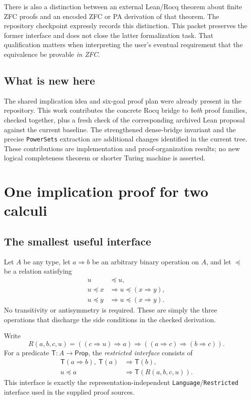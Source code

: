 \documentclass[11pt]{article}
\newcommand{\Imp}{\mathbin{\Rightarrow}}
\newcommand{\Below}{\mathrel{\preccurlyeq}}
\newcommand{\Th}{\mathsf{T}}
\begin{document}
There is also a distinction between an external Lean/Rocq theorem about finite ZFC proofs and an encoded ZFC or PA derivation of that theorem. The repository checkpoint expressly records this distinction. This packet preserves the former interface and does not close the latter formalization task. That qualification matters when interpreting the user's eventual requirement that the equivalence be provable \emph{in ZFC}.

\subsection{What is new here}

The shared implication idea and six-goal proof plan were already present in the repository. This work contributes the concrete Rocq bridge to \emph{both} proof families, checked together, plus a fresh check of the corresponding archived Lean proposal against the current baseline. The strengthened dense-bridge invariant and the precise \texttt{PowerSets} extraction are additional changes identified in the current tree. These contributions are implementation and proof-organization results; no new logical completeness theorem or shorter Turing machine is asserted.

\section{One implication proof for two calculi}

\subsection{The smallest useful interface}

Let $A$ be any type, let $a\Imp b$ be an arbitrary binary operation on $A$, and let $\Below$ be a relation satisfying
\begin{align*}
u&\Below u,\\
u\Below x&\Longrightarrow u\Below(x\Imp y),\\
u\Below y&\Longrightarrow u\Below(x\Imp y).
\end{align*}
No transitivity or antisymmetry is required. These are simply the three operations that discharge the side conditions in the checked derivation.

Write
\[
 R(a,b,c,u)=((c\Imp u)\Imp a)\Imp((a\Imp c)\Imp(b\Imp c)).
\]
For a predicate $\Th:A\to\mathsf{Prop}$, the \emph{restricted interface} consists of
\begin{align*}
\Th(a\Imp b),\ \Th(a)&\Longrightarrow\Th(b),\\
u\Below a&\Longrightarrow\Th(R(a,b,c,u)).
\end{align*}
This interface is exactly the representation-independent \texttt{Language}/\texttt{Restricted} interface used in the supplied proof sources.
\end{document}
